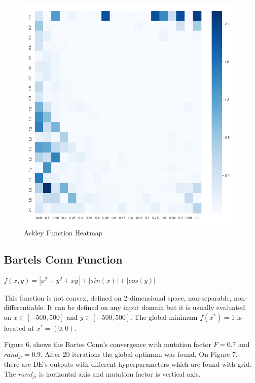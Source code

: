 \documentclass[A4, twocolumn]{article}
\begin{document}
	  \begin{figure}
	 	\includegraphics[width=\linewidth]{ackley/ackley_heatmap.png}
	 	\caption{Ackley Function Heatmap}
	 	\label{fig:Ackley Function Heatmap}
	 \end{figure}

 
 	\subsection*{\textbf{Bartels Conn Function}}
 	
 	$f(x,y)=|x^2 + y^2 + xy| + |sin(x)| + |cos(y)|$
 	
 	This function is not convex, defined on 2-dimensional space, non-separable, non-differentiable. It can be defined on any input domain but it is usually evaluated on $x \in [-500, 500]$ and $y \in [-500, 500]$. The global minimum $f(x^*) = 1$ is located at $x^* = (0,0)$.
 	
 	Figure 6. shows the Bartes Conn's convergence with mutation factor $F = 0.7$ and $rand_{ji} = 0.9$. After 20 iterations the global optimum was found. On Figure 7. there are DE's outputs with different hyperparameters which are found with grid. The $rand_{ji}$ is horizontal axis and mutation factor is vertical axis.
 	
\end{document}

